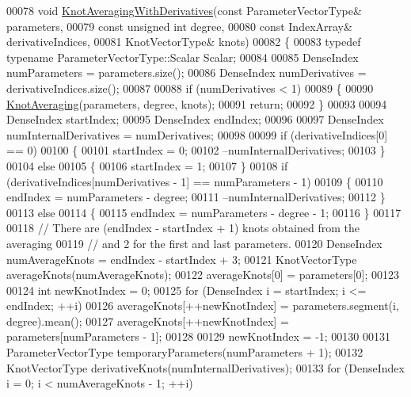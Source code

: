 \begin{DoxyCode}
00078   \textcolor{keywordtype}{void} \hyperlink{group___splines___module_gae10a6f9b6ab7fb400a2526b6382c533b}{KnotAveragingWithDerivatives}(\textcolor{keyword}{const} ParameterVectorType& parameters,
00079                                     \textcolor{keyword}{const} \textcolor{keywordtype}{unsigned} \textcolor{keywordtype}{int} degree,
00080                                     \textcolor{keyword}{const} IndexArray& derivativeIndices,
00081                                     KnotVectorType& knots)
00082   \{
00083     \textcolor{keyword}{typedef} \textcolor{keyword}{typename} ParameterVectorType::Scalar Scalar;
00084 
00085     DenseIndex numParameters = parameters.size();
00086     DenseIndex numDerivatives = derivativeIndices.size();
00087 
00088     \textcolor{keywordflow}{if} (numDerivatives < 1)
00089     \{
00090       \hyperlink{group___splines___module_ga9474da5ed68bbd9a6788a999330416d6}{KnotAveraging}(parameters, degree, knots);
00091       \textcolor{keywordflow}{return};
00092     \}
00093 
00094     DenseIndex startIndex;
00095     DenseIndex endIndex;
00096   
00097     DenseIndex numInternalDerivatives = numDerivatives;
00098     
00099     \textcolor{keywordflow}{if} (derivativeIndices[0] == 0)
00100     \{
00101       startIndex = 0;
00102       --numInternalDerivatives;
00103     \}
00104     \textcolor{keywordflow}{else}
00105     \{
00106       startIndex = 1;
00107     \}
00108     \textcolor{keywordflow}{if} (derivativeIndices[numDerivatives - 1] == numParameters - 1)
00109     \{
00110       endIndex = numParameters - degree;
00111       --numInternalDerivatives;
00112     \}
00113     \textcolor{keywordflow}{else}
00114     \{
00115       endIndex = numParameters - degree - 1;
00116     \}
00117 
00118     \textcolor{comment}{// There are (endIndex - startIndex + 1) knots obtained from the averaging}
00119     \textcolor{comment}{// and 2 for the first and last parameters.}
00120     DenseIndex numAverageKnots = endIndex - startIndex + 3;
00121     KnotVectorType averageKnots(numAverageKnots);
00122     averageKnots[0] = parameters[0];
00123 
00124     \textcolor{keywordtype}{int} newKnotIndex = 0;
00125     \textcolor{keywordflow}{for} (DenseIndex i = startIndex; i <= endIndex; ++i)
00126       averageKnots[++newKnotIndex] = parameters.segment(i, degree).mean();
00127     averageKnots[++newKnotIndex] = parameters[numParameters - 1];
00128 
00129     newKnotIndex = -1;
00130   
00131     ParameterVectorType temporaryParameters(numParameters + 1);
00132     KnotVectorType derivativeKnots(numInternalDerivatives);
00133     \textcolor{keywordflow}{for} (DenseIndex i = 0; i < numAverageKnots - 1; ++i)

\end{DoxyCode}
